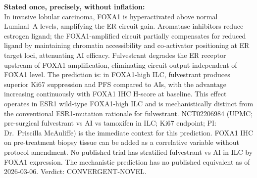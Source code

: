 \documentclass[12pt, a4paper]{article}
\begin{document}
\begin{center}
\colorbox{findingbox}{
\begin{minipage}{0.88\textwidth}
\vspace{0.6em}
\textbf{Stated once, precisely, without
inflation:}\\[0.5em]
In invasive lobular carcinoma, FOXA1 is
hyperactivated above normal Luminal~A levels,
amplifying the ER circuit gain. Aromatase
inhibitors reduce estrogen ligand; the
FOXA1-amplified circuit partially compensates
for reduced ligand by maintaining chromatin
accessibility and co-activator positioning at
ER target loci, attenuating AI efficacy.
Fulvestrant degrades the ER receptor upstream
of FOXA1 amplification, eliminating circuit
output independent of FOXA1 level. The prediction
is: in FOXA1-high ILC, fulvestrant produces
superior Ki67 suppression and PFS compared to
AIs, with the advantage increasing continuously
with FOXA1 IHC H-score at baseline. This effect
operates in ESR1 wild-type FOXA1-high ILC and
is mechanistically distinct from the conventional
ESR1-mutation rationale for fulvestrant. NCT02206984
(UPMC; pre-surgical fulvestrant vs AI vs tamoxifen
in ILC; Ki67 endpoint; PI: Dr.\ Priscilla McAuliffe)
is the immediate context for this prediction.
FOXA1 IHC on pre-treatment biopsy tissue can be
added as a correlative variable without protocol
amendment. No published trial has stratified
fulvestrant vs AI in ILC by FOXA1 expression.
The mechanistic prediction has no published
equivalent as of 2026-03-06.
Verdict: CONVERGENT-NOVEL.
\vspace{0.5em}
\end{minipage}}
\end{center}
\end{document}
